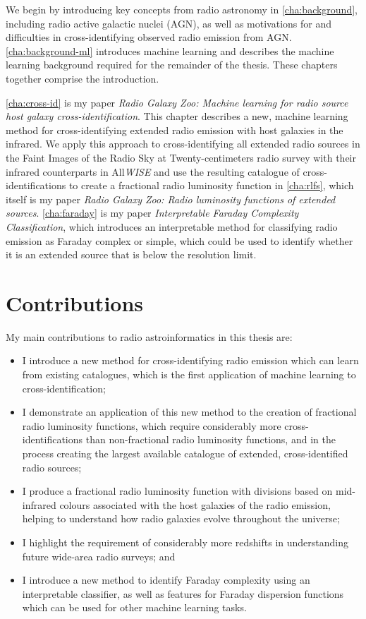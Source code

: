 We begin by introducing key concepts from radio astronomy in \autoref{cha:background}, including radio active galactic nuclei (AGN), as well as motivations for and difficulties in cross-identifying observed radio emission from AGN. \autoref{cha:background-ml} introduces machine learning and describes the machine learning background required for the remainder of the thesis. These chapters together comprise the introduction.

\autoref{cha:cross-id} is my paper \emph{Radio Galaxy Zoo: Machine learning for radio source host galaxy cross-identification}. This chapter describes a new, machine learning method for cross-identifying extended radio emission with host galaxies in the infrared. We apply this approach to cross-identifying all extended radio sources in the Faint Images of the Radio Sky at Twenty-centimeters radio survey \citep[FIRST;][]{becker95first} with their infrared counterparts in All\emph{WISE} \citep{cutri2013wiseexplanatory} and use the resulting catalogue of cross-identifications to create a fractional radio luminosity function in \autoref{cha:rlfs}, which itself is my paper \emph{Radio Galaxy Zoo: Radio luminosity functions of extended sources}. \autoref{cha:faraday} is my paper \emph{Interpretable Faraday Complexity Classification}, which introduces an interpretable method for classifying radio emission as Faraday complex or simple, which could be used to identify whether it is an extended source that is below the resolution limit.

\section{Contributions}
\label{sec:contributions}

My main contributions to radio astroinformatics in this thesis are:
\begin{itemize}
    \item I introduce a new method for cross-identifying radio emission which can learn from existing catalogues, which is the first application of machine learning to cross-identification;
    \item I demonstrate an application of this new method to the creation of fractional radio luminosity functions, which require considerably more cross-identifications than non-fractional radio luminosity functions, and in the process creating the largest available catalogue of extended, cross-identified radio sources;
    \item I produce a fractional radio luminosity function with divisions based on mid-infrared colours associated with the host galaxies of the radio emission, helping to understand how radio galaxies evolve throughout the universe;
    \item I highlight the requirement of considerably more redshifts in understanding future wide-area radio surveys; and
    \item I introduce a new method to identify Faraday complexity using an interpretable classifier, as well as features for Faraday dispersion functions which can be used for other machine learning tasks.
\end{itemize}
